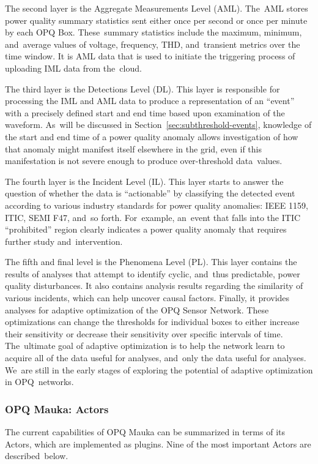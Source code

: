 \documentclass[energies,article,accept,moreauthors,pdftex]{Definitions/mdpi}
\begin{document}
The second layer is the Aggregate Measurements Level (AML). The~AML stores power quality summary statistics sent either once per second or once per minute by each OPQ Box. These~summary statistics include the maximum, minimum, and~average values of voltage, frequency, THD, and~transient metrics over the time window. It is AML data that is used to initiate the triggering process of uploading IML data from the~cloud.

The third layer is the Detections Level (DL). This layer is responsible for processing the IML and AML data to produce a representation of an ``event'' with a precisely defined start and end time based upon examination of the waveform. As~will be discussed in Section~\ref{sec:subthreshold-events}, knowledge of the start and end time of a power quality anomaly allows investigation of how that anomaly might manifest itself elsewhere in the grid, even if this manifestation is not severe enough to produce over-threshold data~values.

The fourth layer is the Incident Level (IL). This layer starts to answer the question of whether the data is ``actionable'' by classifying the detected event according to various industry standards for power quality anomalies: IEEE 1159, ITIC, SEMI F47, and~so forth. For~example, an~event that falls into the ITIC ``prohibited'' region clearly indicates a power quality anomaly that requires further study and~intervention.

The fifth and final level is the Phenomena Level (PL). This layer contains the results of analyses that attempt to identify cyclic, and~thus predictable, power quality disturbances. It also contains analysis results regarding the similarity of various incidents, which can help uncover causal factors. Finally, it provides analyses for adaptive optimization of the OPQ Sensor Network. These optimizations can change the thresholds for individual boxes to either increase their sensitivity or decrease their sensitivity over specific intervals of time. The~ultimate goal of adaptive optimization is to help the network learn to acquire all of the data useful for analyses, and~only the data useful for analyses. We~are still in the early stages of exploring the potential of adaptive optimization in OPQ~networks.

\subsubsection*{OPQ Mauka: Actors}

The current capabilities of OPQ Mauka can be summarized in terms of its Actors, which are implemented as plugins. Nine of the most important Actors are described~below.
\end{document}
